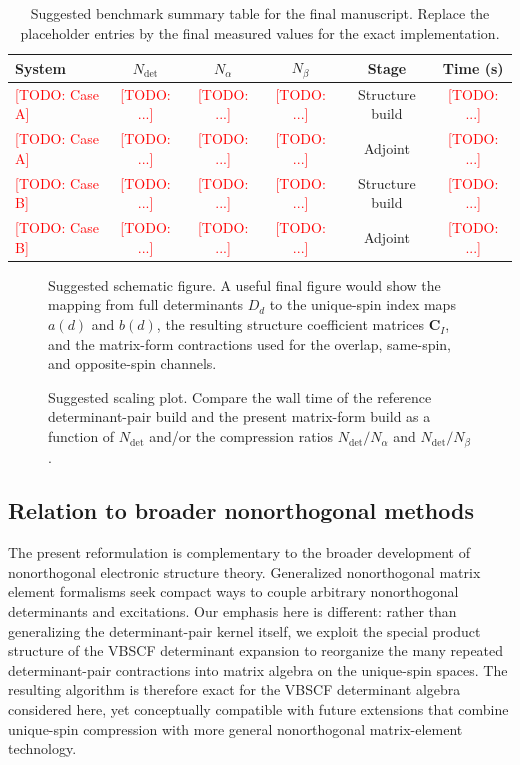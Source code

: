 \documentclass[journal=jctcce,manuscript=article]{achemso}
\newcommand{\na}{N_{\alpha}}
\newcommand{\nb}{N_{\beta}}
\newcommand{\ndet}{N_{\mathrm{det}}}
\newcommand{\Cmat}{\mathbf{C}}
\newcommand{\todo}[1]{\textcolor{red}{[TODO: #1]}}
\begin{document}
\begin{table}[t]
  \caption{Suggested benchmark summary table for the final manuscript.
  Replace the placeholder entries by the final measured values for the exact
  implementation.}
  \label{tab:benchmark-summary}
  \begin{tabular}{lccccc}
    \toprule
    System & $\ndet$ & $\na$ & $\nb$ & Stage & Time (s) \\
    \midrule
    \todo{Case A} & \todo{...} & \todo{...} & \todo{...} & Structure build & \todo{...} \\
    \todo{Case A} & \todo{...} & \todo{...} & \todo{...} & Adjoint & \todo{...} \\
    \todo{Case B} & \todo{...} & \todo{...} & \todo{...} & Structure build & \todo{...} \\
    \todo{Case B} & \todo{...} & \todo{...} & \todo{...} & Adjoint & \todo{...} \\
    \bottomrule
  \end{tabular}
\end{table}

\begin{figure}[t]
  \centering
  \fbox{\rule{0pt}{2.0in}\rule{0.9\linewidth}{0pt}}
  \caption{Suggested schematic figure. A useful final figure would show the
  mapping from full determinants $D_d$ to the unique-spin index maps $a(d)$ and
  $b(d)$,
  the resulting structure coefficient matrices $\Cmat_I$, and the matrix-form
  contractions used for the overlap, same-spin, and opposite-spin channels.}
  \label{fig:scheme}
\end{figure}

\begin{figure}[t]
  \centering
  \fbox{\rule{0pt}{2.0in}\rule{0.9\linewidth}{0pt}}
  \caption{Suggested scaling plot. Compare the wall time of the reference
  determinant-pair build and the present matrix-form build as a function of
  $\ndet$ and/or the compression ratios
  $\ndet/\na$ and $\ndet/\nb$.}
  \label{fig:scaling}
\end{figure}

\subsection{Relation to broader nonorthogonal methods}
The present reformulation is complementary to the broader development of
nonorthogonal electronic structure theory. Generalized nonorthogonal matrix
element formalisms seek compact ways to couple arbitrary nonorthogonal
determinants and excitations. Our emphasis here is different: rather than
generalizing the determinant-pair kernel itself, we exploit the special product
structure of the VBSCF determinant expansion to reorganize the many repeated determinant-pair
contractions into matrix algebra on the unique-spin spaces. The resulting
algorithm is therefore exact for the VBSCF determinant algebra considered here,
yet conceptually compatible with future extensions that combine unique-spin
compression with more general nonorthogonal matrix-element technology.
\end{document}
